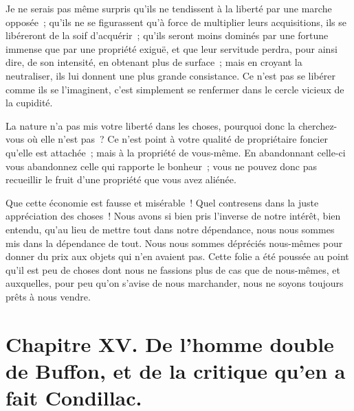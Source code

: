 \documentclass[french,twoside]{book} %
\newcommand\chapteropen{} %
\newcommand\chapterclose{} %
\begin{document}
Je ne serais pas même surpris qu’ils ne tendissent à la liberté par une marche opposée ; qu’ils ne se figurassent qu’à force de multiplier leurs acquisitions, ils se libéreront de la soif d’acquérir ; qu’ils seront moins dominés par une fortune immense que par une propriété exiguë, et que leur servitude perdra, pour ainsi dire, de son intensité, en obtenant plus de surface ; mais en croyant la neutraliser, ils lui donnent une plus grande consistance. Ce n’est pas se libérer comme ils se l’imaginent, c’est simplement se renfermer dans le cercle vicieux de la cupidité.\par
La nature n’a pas mis votre liberté dans les choses, pourquoi donc la cherchez-vous où elle n’est pas ? Ce n’est point à votre qualité de propriétaire foncier qu’elle est attachée ; mais à la propriété de vous-même. En abandonnant celle-ci vous abandonnez celle qui rapporte le bonheur ; vous ne pouvez donc pas recueillir le fruit d’une propriété que vous avez aliénée.\par
Que cette économie est fausse et misérable ! Quel contresens dans la juste appréciation des choses ! Nous avons si bien pris l’inverse de notre intérêt, bien entendu, qu’au lieu de mettre tout dans notre dépendance, nous nous sommes mis dans la dépendance de tout. Nous nous sommes dépréciés nous-mêmes pour donner du prix aux objets qui n’en avaient pas. Cette folie a été poussée au point qu’il est peu de choses dont nous ne fassions plus de cas que de nous-mêmes, et auxquelles, pour peu qu’on s’avise de nous marchander, nous ne soyons toujours prêts à nous vendre.
\chapterclose


\chapteropen
\chapter[{Chapitre XV. De l’homme double de Buffon, et de la critique qu’en a fait Condillac.}]{Chapitre XV. De l’homme double de Buffon, et de la critique qu’en a fait Condillac.}\renewcommand{\leftmark}{Chapitre XV. De l’homme double de Buffon, et de la critique qu’en a fait Condillac.}
\end{document}
